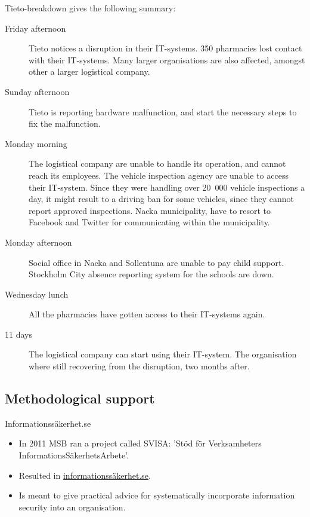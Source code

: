 \documentclass{beamer}
\begin{document}
\begin{frame}[allowframebreaks]{Tieto-breakdown}
  \cite{Lindkvist2012tdf} gives the following summary:
  \begin{description}
    \item[Friday afternoon] Tieto notices a disruption in their IT-systems.
      350 pharmacies lost contact with their IT-systems.
      Many larger organisations are also affected, amongst other a larger
      logistical company.

    \item[Sunday afternoon] Tieto is reporting hardware malfunction, and start
     the necessary steps to fix the malfunction.

    \item[Monday morning] The logistical company are unable to handle its
      operation, and cannot reach its employees.
      The vehicle inspection agency are unable to access their IT-system. Since
      they were handling over 20\, 000 vehicle inspections a day, it might
      result to a driving ban for some vehicles, since they cannot report
      approved inspections.
      Nacka municipality, have to resort to Facebook and Twitter for
      communicating within the municipality.

    \item[Monday afternoon] Social office in Nacka and Sollentuna are unable to
      pay child support.
      Stockholm City absence reporting system for the schools are down.

    \item[Wednesday lunch] All the pharmacies have gotten access to their
      IT-systems again.

    \item[11 days] The logistical company can start using their IT-system.
      The organisation where still recovering from the disruption, two months
      after.
  \end{description}
\end{frame}

\subsection{Methodological support}

\begin{frame}{Informationssäkerhet.se}
  \begin{itemize}
    \item In 2011 MSB ran a project called SVISA\@: 'Stöd för Verksamheters 
      InformationsSäkerhetsArbete'.

    \item Resulted in \url{informationssäkerhet.se}.

    \item Is meant to give practical advice for systematically incorporate
      information security into an organisation.
  \end{itemize}
\end{frame}
\end{document}
